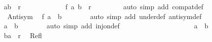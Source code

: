 \begin{isabellebody}
\isamarkupfalse%
\ {\isachardoublequoteopen}{\isacharparenleft}{\kern0pt}a{\isacharcomma}{\kern0pt}b{\isacharparenright}{\kern0pt}\ {\isasymin}\ r{\isachardoublequoteclose}\isanewline
\ \ \ \ \ \ \ \isamarkupfalse%
\ {\isacharasterisk}{\kern0pt}{\isacharasterisk}{\kern0pt}\ {}\ \isamarkupfalse%
\ {\isachardoublequoteopen}{\isacharparenleft}{\kern0pt}f\ a{\isacharcomma}{\kern0pt}\ b{\isacharprime}{\kern0pt}{\isacharparenright}{\kern0pt}\ {\isasymin}\ r{\isacharprime}{\kern0pt}{\isachardoublequoteclose}\isanewline
\ \ \ \ \ \ \ \isamarkupfalse%
\ {\isacharparenleft}{\kern0pt}auto\ simp\ add{\isacharcolon}{\kern0pt}\ compat{\isacharunderscore}{\kern0pt}def{\isacharparenright}{\kern0pt}\isanewline
\ \ \ \ \ \ \ \isamarkupfalse%
\ {\isacharasterisk}{\kern0pt}{\isacharasterisk}{\kern0pt}{\isacharasterisk}{\kern0pt}{\isacharasterisk}{\kern0pt}{\isacharasterisk}{\kern0pt}\ Antisym{\isacharprime}{\kern0pt}\ \isamarkupfalse%
\ {\isachardoublequoteopen}f\ a\ {\isacharequal}{\kern0pt}\ b{\isacharprime}{\kern0pt}{\isachardoublequoteclose}\isanewline
\ \ \ \ \ \ \ \isamarkupfalse%
{\isacharparenleft}{\kern0pt}auto\ simp\ add{\isacharcolon}{\kern0pt}\ under{\isacharunderscore}{\kern0pt}def\ antisym{\isacharunderscore}{\kern0pt}def{\isacharparenright}{\kern0pt}\isanewline
\ \ \ \ \ \ \ \isamarkupfalse%
\ {}\ {\isacharasterisk}{\kern0pt}{\isacharasterisk}{\kern0pt}{\isacharasterisk}{\kern0pt}{\isacharasterisk}{\kern0pt}\ {}\ {\isacharasterisk}{\kern0pt}\ \isamarkupfalse%
\ {\isachardoublequoteopen}a\ {\isacharequal}{\kern0pt}\ b{\isachardoublequoteclose}\isanewline
\ \ \ \ \ \ \ \isamarkupfalse%
{\isacharparenleft}{\kern0pt}auto\ simp\ add{\isacharcolon}{\kern0pt}\ inj{\isacharunderscore}{\kern0pt}on{\isacharunderscore}{\kern0pt}def{\isacharparenright}{\kern0pt}\isanewline
\ \ \ \ \ \ \isacommand{{\isacharbraceright}{\kern0pt}}\isamarkupfalse%
\isanewline
\ \ \ \ \ \ \isamarkupfalse%
\isanewline
\ \ \ \ \ \ \isacommand{{\isacharbraceleft}{\kern0pt}}\isamarkupfalse%
\isamarkupfalse%
\ {\isachardoublequoteopen}a\ {\isacharequal}{\kern0pt}\ b{\isachardoublequoteclose}\isanewline
\ \ \ \ \ \ \ \isamarkupfalse%
\ {\isachardoublequoteopen}{\isacharparenleft}{\kern0pt}b{\isacharcomma}{\kern0pt}a{\isacharparenright}{\kern0pt}\ {\isasymin}\ r{\isachardoublequoteclose}\ \isamarkupfalse%
\ Refl\ {\isacharasterisk}{\kern0pt}{\isacharasterisk}{\kern0pt}{\isacharasterisk}{\kern0pt}{\isacharasterisk}{\kern0pt}\ {}\isanewline

\end{isabellebody}
